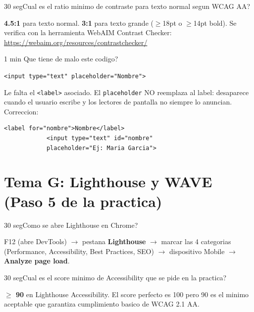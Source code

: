 \documentclass[11pt,a4paper]{article}
\newcounter{nej}
\newcommand{\ej}[2]{%
	\stepcounter{nej}%
	\begin{ejercicio}{\arabic{nej}}{#1}#2\end{ejercicio}\vspace{4pt}}
\begin{document}
	\ej{30 seg}{Cual es el ratio minimo de contraste para texto normal segun WCAG AA?}
	
	\begin{respuesta}
		\textbf{4.5:1} para texto normal. \textbf{3:1} para texto grande ($\geq$18pt o $\geq$14pt bold). Se verifica con la herramienta WebAIM Contrast Checker: \url{https://webaim.org/resources/contrastchecker/}
	\end{respuesta}
	\vspace{6pt}
	
	\stepcounter{nej}
	\begin{ejercicio}{}{1 min}
		Que tiene de malo este codigo?
		
		\texttt{<input type="text" placeholder="Nombre">}
	\end{ejercicio}
	\vspace{4pt}
	
	\begin{respuesta}
		Le falta el \texttt{<label>} asociado. El \texttt{placeholder} NO reemplaza al label: desaparece cuando el usuario escribe y los lectores de pantalla no siempre lo anuncian. Correccion:
		\begin{lstlisting}[style=codehtml]
			<label for="nombre">Nombre</label>
			<input type="text" id="nombre"
			placeholder="Ej: Maria Garcia">
		\end{lstlisting}
	\end{respuesta}
	\vspace{6pt}
	
	\section{Tema G: Lighthouse y WAVE (Paso 5 de la practica)}
	
	\ej{30 seg}{Como se abre Lighthouse en Chrome?}
	
	\begin{respuesta}
		F12 (abre DevTools) $\to$ pestana \textbf{Lighthouse} $\to$ marcar las 4 categorias (Performance, Accessibility, Best Practices, SEO) $\to$ dispositivo Mobile $\to$ \textbf{Analyze page load}.
	\end{respuesta}
	\vspace{6pt}
	
	\ej{30 seg}{Cual es el score minimo de Accessibility que se pide en la practica?}
	
	\begin{respuesta}
		\textbf{$\geq$ 90} en Lighthouse Accessibility. El score perfecto es 100 pero 90 es el minimo aceptable que garantiza cumplimiento basico de WCAG 2.1 AA.
	\end{respuesta}
	\vspace{6pt}
	
\end{document}
